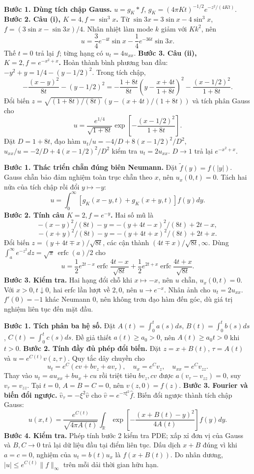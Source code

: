 \textbf{Bước 1. Dùng tích chập Gauss.} $u=g_K*f$, $g_K=(4\pi Kt)^{-1/2}e^{-z^2/(4Kt)}$.
\textbf{Bước 2. Câu (i), $K=4,f=\sin^3x$.}
Từ $\sin3x=3\sin x-4\sin^3x$, $f=(3\sin x-\sin3x)/4$. Nhân nhiệt làm mode $k$ giảm với $Kk^2$, nên
\[u=\frac34e^{-4t}\sin x-\frac14e^{-36t}\sin3x.\]
Thế $t=0$ trả lại $f$; từng hạng có $u_t=4u_{xx}$.
\textbf{Bước 3. Câu (ii), $K=2,f=e^{-x^2+x}$.}
Hoàn thành bình phương ban đầu: $-y^2+y=1/4-(y-1/2)^2$. Trong tích chập,
\[-\frac{(x-y)^2}{8t}-(y-1/2)^2
=-\frac{1+8t}{8t}\left(y-\frac{x+4t}{1+8t}\right)^2
-\frac{(x-1/2)^2}{1+8t}.\]
Đổi biến $z=\sqrt{(1+8t)/(8t)}(y-(x+4t)/(1+8t))$ và tích phân Gauss cho
\[u=\frac{e^{1/4}}{\sqrt{1+8t}}
\exp\left[-\frac{(x-1/2)^2}{1+8t}\right].\]
Đặt $D=1+8t$, đạo hàm $u_t/u=-4/D+8(x-1/2)^2/D^2$, $u_{xx}/u=-2/D+4(x-1/2)^2/D^2$ kiểm tra $u_t=2u_{xx}$. $D\to1$ trả lại $e^{-x^2+x}$.

\textbf{Bước 1. Thác triển chẵn đúng biên Neumann.}
Đặt $\widetilde f(y)=f(|y|)$. Gauss chẵn bảo đảm nghiệm toàn trục chẵn theo $x$, nên $u_x(0,t)=0$. Tách hai nửa của tích chập rồi đổi $y\mapsto-y$:
\[u=\int_0^\infty[g_K(x-y,t)+g_K(x+y,t)]f(y)dy.\]
\textbf{Bước 2. Tính câu $K=2,f=e^{-y}$.}
Hai số mũ là
\[-(x-y)^2/(8t)-y=-(y+4t-x)^2/(8t)+2t-x,\]
\[-(x+y)^2/(8t)-y=-(y+4t+x)^2/(8t)+2t+x.\]
Đổi biến $z=(y+4t\mp x)/\sqrt{8t}$, các cận thành $(4t\mp x)/\sqrt{8t},\infty$. Dùng $\int_a^\infty e^{-z^2}dz=\sqrt\pi\,\operatorname{erfc}(a)/2$ cho
\[u=\frac12e^{2t-x}\operatorname{erfc}\frac{4t-x}{\sqrt{8t}}
+\frac12e^{2t+x}\operatorname{erfc}\frac{4t+x}{\sqrt{8t}}.\]
\textbf{Bước 3. Kiểm tra.}
Hai hạng đổi chỗ khi $x\mapsto-x$, nên $u$ chẵn, $u_x(0,t)=0$. Với $x>0,t\downarrow0$, hai erfc lần lượt về $2,0$, nên $u\to e^{-x}$. Nhân ảnh cho $u_t=2u_{xx}$. $f'(0)=-1$ khác Neumann $0$, nên không trơn đạo hàm đến góc, dù giá trị nghiệm liên tục đến mặt đầu.

\textbf{Bước 1. Tích phân ba hệ số.}
Đặt $A(t)=\int_0^ta(s)ds$, $B(t)=\int_0^tb(s)ds$, $C(t)=\int_0^tc(s)ds$. Đề giả thiết $a(t)\ge a_0>0$, nên $A(t)\ge a_0t>0$ khi $t>0$.
\textbf{Bước 2. Tính đầy đủ phép đổi biến.}
Đặt $z=x+B(t)$, $\tau=A(t)$ và $u=e^{C(t)}v(z,\tau)$. Quy tắc dây chuyền cho
\[u_t=e^C(cv+bv_z+av_\tau),\quad
u_x=e^Cv_z,\quad u_{xx}=e^Cv_{zz}.\]
Thay vào $u_t=au_{xx}+bu_x+cu$ rồi triệt tiêu $bv_z,cv$ được $a(v_\tau-v_{zz})=0$, suy $v_\tau=v_{zz}$. Tại $t=0$, $A=B=C=0$, nên $v(z,0)=f(z)$.
\textbf{Bước 3. Fourier và biến đổi ngược.}
$\widehat v_\tau=-\xi^2\widehat v$ cho $\widehat v=e^{-\tau\xi^2}\widehat f$. Biến đổi ngược thành tích chập Gauss:
\[u(x,t)=\frac{e^{C(t)}}{\sqrt{4\pi A(t)}}\int_{\mathbb R}
\exp\left[-\frac{(x+B(t)-y)^2}{4A(t)}\right]f(y)dy.\]
\textbf{Bước 4. Kiểm tra.}
Phép tính bước 2 kiểm tra PDE; xấp xỉ đơn vị của Gauss và $B,C\to0$ trả lại dữ liệu đầu tại điểm liên tục. Dấu dịch $x+B$ đúng vì khi $a=c=0$, nghiệm của $u_t=b(t)u_x$ là $f(x+B(t))$. Do nhân dương, $|u|\le e^{C(t)}\|f\|_\infty$ trên mỗi dải thời gian hữu hạn.

